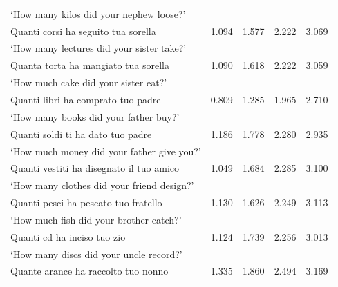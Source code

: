 \documentclass[output=paper]{langsci/langscibook}
\begin{document}
\begin{table}
{\begin{tabular}{lrrrr}
`How many kilos did your nephew loose?’                        &        &                &               &               \\
Quanti corsi ha seguito tua sorella                            & 1.094  &  1.577         & 2.222         & 3.069         \\
`How many lectures did your sister take?’                      &        &                &               &               \\
Quanta torta ha mangiato tua sorella                           & 1.090  &  1.618         & 2.222         & 3.059         \\
`How much cake did your sister eat?’                            &        &                &               &               \\
Quanti libri ha comprato tuo padre                             & 0.809  &  1.285         & 1.965         & 2.710         \\
`How many books did your father buy?’                           &        &                &               &               \\
Quanti soldi ti ha dato tuo padre                              & 1.186  &  1.778         & 2.280         & 2.935         \\
`How much money did your father give you?’                      &        &                &               &               \\
Quanti vestiti ha disegnato il tuo amico                       & 1.049  &  1.684         & 2.285         & 3.100         \\
`How many clothes did your friend design?’                      &        &                &               &               \\
Quanti pesci ha pescato tuo fratello                           & 1.130  &  1.626         & 2.249         & 3.113         \\
`How much fish did your brother catch?’                         &        &                &               &               \\
Quanti cd ha inciso tuo zio                                    & 1.124  &  1.739         & 2.256         & 3.013         \\
`How many discs did your uncle record?’                         &        &                &               &               \\
Quante arance ha raccolto tuo nonno                            & 1.335  &  1.860         & 2.494         & 3.169         \\

\end{tabular}}
\end{table}
\end{document}
